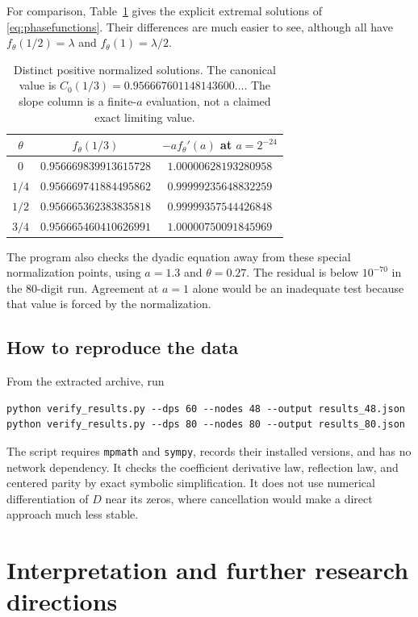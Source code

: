 \documentclass[11pt,letterpaper]{article}
\numberwithin{equation}{section}
\theoremstyle{definition}
\theoremstyle{remark}
\begin{document}
For comparison, Table~\ref{tab:phases} gives the explicit extremal
solutions of \eqref{eq:phasefunctions}. Their differences are much easier
to see, although all have $f_\theta(1/2)=\lambda$ and
$f_\theta(1)=\lambda/2$.

\begin{table}[htbp]
\centering
\begin{tabular}{ccc}
\toprule
$\theta$ & $f_\theta(1/3)$ & $-a f_\theta'(a)$ at $a=2^{-24}$\\
\midrule
$0$   & $0.956669839913615728$ & $1.00000628193280958$\\
$1/4$ & $0.956669741884495862$ & $0.99999235648832259$\\
$1/2$ & $0.956665362383835818$ & $0.99999357544426848$\\
$3/4$ & $0.956665460410626991$ & $1.00000750091845969$\\
\bottomrule
\end{tabular}
\caption{Distinct positive normalized solutions. The canonical value is
$C_0(1/3)=0.956667601148143600\ldots$. The slope column is a finite-$a$
evaluation, not a claimed exact limiting value.}
\label{tab:phases}
\end{table}

The program also checks the dyadic equation away from these special
normalization points, using $a=1.3$ and $\theta=0.27$.
The residual is below $10^{-70}$ in the 80-digit run.
Agreement at $a=1$ alone would be an inadequate test because that value
is forced by the normalization.

\subsection{How to reproduce the data}
From the extracted archive, run
\begin{verbatim}
python verify_results.py --dps 60 --nodes 48 --output results_48.json
python verify_results.py --dps 80 --nodes 80 --output results_80.json
\end{verbatim}
The script requires \texttt{mpmath} and \texttt{sympy}, records their
installed versions, and has no network dependency. It checks the
coefficient derivative law, reflection law, and centered parity by exact
symbolic simplification. It does not use numerical differentiation of
$D$ near its zeros, where cancellation would make a direct approach much
less stable.

\section{Interpretation and further research directions}\label{sec:outlook}
\end{document}
